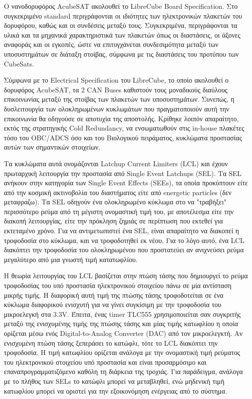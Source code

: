 \documentclass[a4paper,nobib,justified]{tufte-book}
\begin{document}
\par Ο νανοδορυφόρος AcubeSAT ακολουθεί το LibreCube Board Specification. Στο συγκεκριμένο standard περιγράφονται οι ιδιότητες των ηλεκτρονικών πλακετών του δορυφόρου, καθώς και οι συνδέσεις μεταξύ τους. Συγκεκριμένα, περιγράφονται τα υλικά και τα μηχανικά χαρακτηριστικά των πλακετών όπως οι διαστάσεις, οι άξονες αναφοράς και οι εγκοπές, ώστε να επιτυγχάνεται συνδεσιμότητα μεταξύ των υποσυστημάτων σε διάταξη στοίβας, σύμφωνα με τις διαστάσεις του προτύπου των CubeSats.

Σύμφωνα με το Electrical Specification του LibreCube, το οποίο ακολουθεί ο δορυφόρος AcubeSAT, τα 2 CAN Buses καθιστούν τους μοναδικούς διαύλους επικοινωνίας μεταξύ της στοίβας των πλακετών των υποσυστημάτων. 
Συνεπώς, η δυσλειτουργία των ολοκληρωμένων κυκλωμάτων που πραγματοποιούν αυτή την επικοινωνία θα οδηγούσε σε αποτυχία της αποστολής. Κρίθηκε λοιπόν απαραίτητο, εκτός της στρατηγικής Cold Redundancy, να ενσωματωθούν στις in-house πλακέτες τόσο του OBC/ADCS όσο και του Βιολογικού πειράματος, κυκλώματα προστασίας αυτών των σημαντικών στοιχείων. 

Τα κυκλώματα αυτά ονομάζονται Latchup Current Limiters (LCL) και έχουν πρωταρχική λειτουργία την προστασία από Single Event Latchups (SEL). Tα SEL ανήκουν στην κατηγορία των Single Event Effects (SEEs), τα οποία προκύπτουν είτε από την κοσμική ακτινοβολία του διαστήματος είτε από energetic particles (δεν μεταφραζω). Tα SEL οδηγούν ένα ολοκληρωμένο κύκλωμα στο να "τραβήξει" περισσότερο ρεύμα από τη μέγιστη ονομαστική τιμή του, με αποτέλεσμα είτε την διακοπή λειτουργίας, είτε την πρόκληση ζημιάς σε περίπτωση που εκτεθεί για εκτεταμένο χρόνο. Για να αντιμετωπιστεί ένα SEL, είναι απαραίτητο να διακοπεί η τροφοδοσία στο κύκλωμα, και να τροφοδοτηθεί εκ νέου. Για το λόγο αυτό, ένα LCL διακόπτει την τροφοδοσία του ολοκληρωμένου που προστατεύει αν ανιχνεύσει ρεύμα μεγαλύτερο από μια γνωστή τιμή κατατωφλίου.

Η θεωρία λειτουργίας του LCL βασίζεται στην πτώση τάσης που δημιουργεί το ρεύμα τροφοδοσίας του υπό προστασία ηλεκτρονικού στοιχείου πάνω σε μία αντίσταση μικρής τιμής. Η διαφορική αυτή τιμή της πτώσης τάσης τροφοδοτείται σε ένα κύκλωμα διαφορικού ενισχυτή για να γίνει συγκίσιμη με την τροφοδοσία του μικροελεγκή στα 3.3V. Έπειτα, ένας timer TLC555 χρησιμοποιείται σαν συγκριτής μεταξύ της ενισχυμένης τιμής της πτώσης τάσης και μίας τιμής κατωφλίου η οποία ορίζεται μέσω ενός Digital-to-Analog Converter (DAC) από τον μικροελεγκτή. Αν ενισχυμένη πτώση τάσης ξεπεράσει το κατώφλι, τότε το LCL διακόπτει την τροφοδοσία. Η τιμή κατωφλίου ορίζεται ανάλογα με την ονομαστική τιμή ρεύματος του ηλεκτρονικού στοιχείου υπό προστασία και είναι προσαρμόσιμο και επαναπρογραμματιζόμενο καθόλη τη διάρκεια της τροχιάς. Για παράδειγμα, ανάλογα με το πλήθος των SELs το κατώφλι μπορεί να μεταβληθεί, ενώ μηδενική τιμή κατωφλίου μπορεί να οριστεί για την εξοικονόμηση ενέργειας από το σύστημα.
\end{document}

